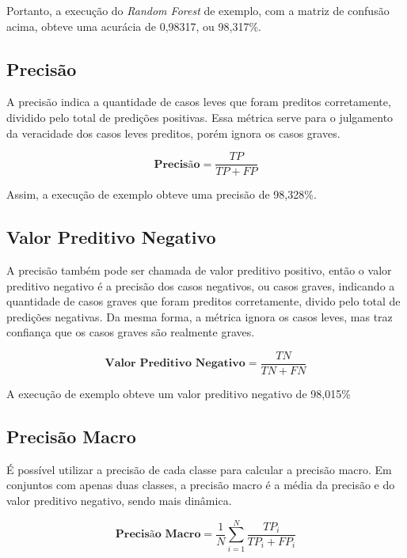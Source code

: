 Portanto, a execução do \textit{Random Forest} de exemplo, com a matriz de confusão acima, obteve uma acurácia de 0,98317, ou 98,317\%.

\subsection{Precisão}
\label{subsec:precisao}

A precisão indica a quantidade de casos leves que foram preditos corretamente, dividido pelo total de predições positivas. Essa métrica serve para o julgamento da veracidade dos casos leves preditos, porém ignora os casos graves.

  \begin{equation}
    \textbf{Precisão} = \frac{TP}{TP + FP}
  \end{equation}

Assim, a execução de exemplo obteve uma precisão de 98,328\%.

\subsection{Valor Preditivo Negativo}
\label{subsec:valor-preditivo-negativo}

A precisão também pode ser chamada de valor preditivo positivo, então o valor preditivo negativo é a precisão dos casos negativos, ou casos graves, indicando a quantidade de casos graves que foram preditos corretamente, divido pelo total de predições negativas. Da mesma forma, a métrica ignora os casos leves, mas traz confiança que os casos graves são realmente graves.

  \begin{equation}
    \textbf{Valor Preditivo Negativo} = \frac{TN}{TN + FN}
  \end{equation}

A execução de exemplo obteve um valor preditivo negativo de 98,015\%

\subsection{Precisão Macro}
\label{subsec:precisao-macro}

É possível utilizar a precisão de cada classe para calcular a precisão macro. Em conjuntos com apenas duas classes, a precisão macro é a média da precisão e do valor preditivo negativo, sendo mais dinâmica.

  \begin{equation}
    \textbf{Precisão Macro} = \frac{1}{N}\sum_{i=1}^{N}\frac{TP_{i}}{TP_{i} + FP_{i}}
  \end{equation}

